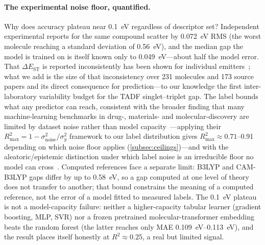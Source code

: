 \paragraph{The experimental noise floor, quantified.}
Why does accuracy plateau near \qty{0.1}{\electronvolt} regardless of descriptor set?
Independent experimental reports for the same compound scatter by
\qty{0.072}{\electronvolt} RMS (the worst molecule reaching a standard deviation of
\qty{0.56}{\electronvolt}), and the median gap the model is trained on is itself known
only to \qty{0.049}{\electronvolt}---about half the model error. That
$\Delta E_\text{ST}$ is reported inconsistently has been shown for individual
emitters~\cite{Shuaib2026}; what we add is the size of that inconsistency over
\num{231} molecules and \num{173} source papers and its direct consequence for
prediction---to our knowledge the first inter-laboratory variability budget for the
TADF singlet--triplet gap. The label bounds what any predictor can reach, consistent
with the broader finding that many machine-learning benchmarks in drug-, materials-
and molecular-discovery are limited by dataset noise rather than model
capacity~\cite{Crusius2025}---applying their $R^2_\text{max} = 1-\sigma^2_\text{noise}/\sigma^2_y$
framework to our label distribution gives $R^2_\text{max} \approx 0.71$--\num{0.91}
depending on which noise floor applies (\cref{subsec:ceilings})---and with the aleatoric/epistemic distinction under
which label noise is an irreducible floor no model can cross~\cite{Heid2023}.
Computed references face a separate limit: B3LYP and
CAM-B3LYP gaps differ by up to \qty{0.58}{\electronvolt}, so a gap computed at one
level of theory does not transfer to another; that bound constrains the meaning of a
computed reference, not the error of a model fitted to measured labels. The
\qty{0.1}{\electronvolt} plateau is not a model-capacity failure: neither a
higher-capacity tabular learner (gradient boosting, MLP, SVR) nor a frozen pretrained
molecular-transformer embedding beats the random forest (the latter reaches only MAE
\qtyrange{0.109}{0.113}{\electronvolt}), and the result places itself honestly at
$R^2 \approx 0.25$, a real but limited signal.

